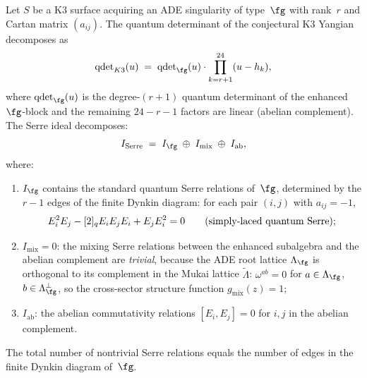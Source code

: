 \begin{conjecture}
\label{conj:k3-serre-enhanced}
\ClaimStatusConjectured
Let $S$ be a K3 surface acquiring an ADE singularity of type~$\fg$ with
rank~$r$ and Cartan matrix $(a_{ij})$.
The quantum determinant of the conjectural K3 Yangian decomposes as
\begin{equation}\label{eq:k3-qdet-decomposition}
 \mathrm{qdet}_{K3}(u) \;=\;
 \mathrm{qdet}_{\fg}(u) \cdot \prod_{k=r+1}^{24} (u - h_k),
\end{equation}
where $\mathrm{qdet}_{\fg}(u)$ is the degree-$(r+1)$ quantum determinant
of the enhanced $\fg$-block and the remaining $24 - r - 1$ factors are
linear (abelian complement). The Serre ideal decomposes:
\begin{equation}\label{eq:k3-serre-decomposition}
 I_{\mathrm{Serre}} \;=\; I_{\fg} \;\oplus\; I_{\mathrm{mix}}
 \;\oplus\; I_{\mathrm{ab}},
\end{equation}
where:
\begin{enumerate}[label=\textup{(\roman*)}]
\item $I_{\fg}$ contains the standard quantum Serre relations of~$\fg$,
 determined by the $r-1$ edges of the finite Dynkin diagram: for each
 pair $(i,j)$ with $a_{ij} = -1$,
 \[
 E_i^2 E_j - [2]_q E_i E_j E_i + E_j E_i^2 = 0
 \qquad \textup{(simply-laced quantum Serre)};
 \]

\item $I_{\mathrm{mix}} = 0$: the mixing Serre relations between the
 enhanced subalgebra and the abelian complement are \emph{trivial},
 because the ADE root lattice $\Lambda_\fg$ is orthogonal to its
 complement in the Mukai lattice $\widetilde{\Lambda}$:
 $\omega^{ab} = 0$ for $a \in \Lambda_\fg$, $b \in \Lambda_\fg^\perp$,
 so the cross-sector structure function $g_{\mathrm{mix}}(z) = 1$;

\item $I_{\mathrm{ab}}$: the abelian commutativity relations
 $[E_i, E_j] = 0$ for $i, j$ in the abelian complement.
\end{enumerate}
The total number of nontrivial Serre relations equals the number of
edges in the finite Dynkin diagram of~$\fg$.
\end{conjecture}

